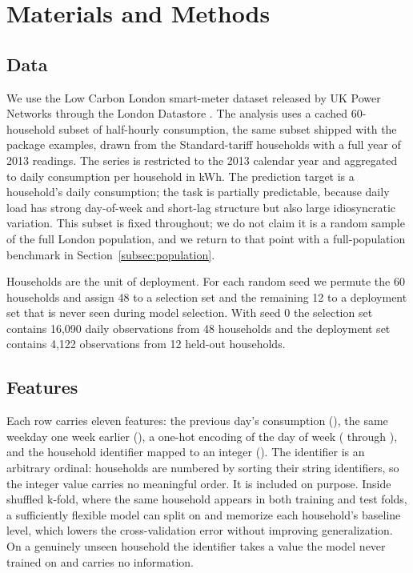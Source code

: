 \documentclass[forecasting,article,submit,oneauthor,pdftex]{Definitions/mdpi}
\DeclareRobustCommand{\code}[1]{\texttt{\detokenize{#1}}}
\begin{document}
\section{Materials and Methods}

\subsection{Data}

We use the Low Carbon London smart-meter dataset released by UK Power Networks
through the London Datastore \citep{ukpn_lcl}. The analysis uses a cached
60-household subset of half-hourly consumption, the same subset shipped with the
package examples, drawn from the Standard-tariff households with a full year of
2013 readings. The series is restricted to the 2013 calendar year and aggregated
to daily consumption per household in kWh. The prediction target is a household's
daily consumption; the task is partially predictable, because daily load has
strong day-of-week and short-lag structure but also large idiosyncratic
variation. This subset is fixed throughout; we do not claim it is a random sample
of the full London population, and we return to that point with a full-population
benchmark in Section~\ref{subsec:population}.

Households are the unit of deployment. For each random seed we permute the 60
households and assign 48 to a selection set and the remaining 12 to a deployment
set that is never seen during model selection. With seed 0 the selection set
contains 16{,}090 daily observations from 48 households and the deployment set
contains 4{,}122 observations from 12 held-out households.

\subsection{Features}

Each row carries eleven features: the previous day's consumption (\code{lag_1}),
the same weekday one week earlier (\code{lag_7}), a one-hot encoding of the day
of week (\code{dow_0} through \code{dow_6}), and the household identifier mapped
to an integer (\code{hh_int}). The identifier is an arbitrary ordinal: households
are numbered by sorting their string identifiers, so the integer value carries no
meaningful order. It is included on purpose. Inside shuffled k-fold, where the
same household appears in both training and test folds, a sufficiently flexible
model can split on \code{hh_int} and memorize each household's baseline level,
which lowers the cross-validation error without improving generalization. On a
genuinely unseen household the identifier takes a value the model never trained
on and carries no information.
\end{document}
